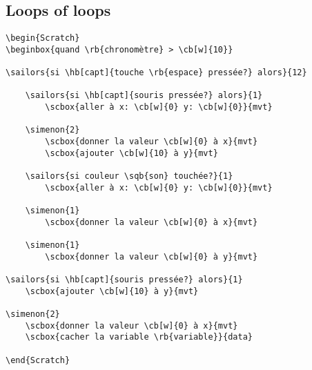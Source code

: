 \documentclass[a4paper,11pt]{article}
\begin{document}
\subsection{Loops of loops}

\begin{verbatim}
\begin{Scratch}
\beginbox{quand \rb{chronomètre} > \cb[w]{10}}

\sailors{si \hb[capt]{touche \rb{espace} pressée?} alors}{12}

	\sailors{si \hb[capt]{souris pressée?} alors}{1}
		\scbox{aller à x: \cb[w]{0} y: \cb[w]{0}}{mvt}

	\simenon{2}
		\scbox{donner la valeur \cb[w]{0} à x}{mvt}
		\scbox{ajouter \cb[w]{10} à y}{mvt}

	\sailors{si couleur \sqb{son} touchée?}{1}
		\scbox{aller à x: \cb[w]{0} y: \cb[w]{0}}{mvt}

	\simenon{1}
		\scbox{donner la valeur \cb[w]{0} à x}{mvt}
		
	\simenon{1}
		\scbox{donner la valeur \cb[w]{0} à y}{mvt}

\sailors{si \hb[capt]{souris pressée?} alors}{1}
	\scbox{ajouter \cb[w]{10} à y}{mvt}

\simenon{2}
	\scbox{donner la valeur \cb[w]{0} à x}{mvt}
	\scbox{cacher la variable \rb{variable}}{data}

\end{Scratch}
\end{verbatim}
\end{document}
